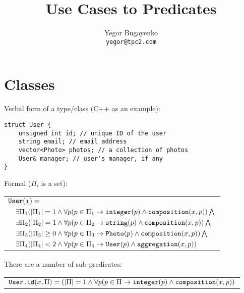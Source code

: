 \documentclass{article}
\begin{document}
\setlength{\parindent}{0pt}
\setlength{\parskip}{1em}
\newcommand{\type}[1]{\mbox{\texttt{#1}}}
\newenvironment{maths}
{
    \vspace*{1em}
    \begin{tabular}{l}
}
{
    \end{tabular}
    \vspace*{1em}
}

\title{Use Cases to Predicates}
\author{Yegor Bugayenko\\\texttt{yegor@tpc2.com}}
\maketitle

\newpage
\section{Classes}

    Verbal form of a type/class (C++ as an example):

    \begin{verbatim}
struct User {
    unsigned int id; // unique ID of the user
    string email; // email address
    vector<Photo> photos; // a collection of photos
    User& manager; // user's manager, if any
}\end{verbatim}

    Formal ($\Pi_i$ is a set):
    
    \begin{maths}
    $\type{User}(x) =$ \\
    $\quad \exists \Pi_1 (|\Pi_1| = 1 \wedge \forall p(p \in \Pi_1 \to \type{integer}(p) \wedge \type{composition}(x, p)) \bigwedge$ \\
    $\quad \exists \Pi_2 (|\Pi_2| = 1 \wedge \forall p(p \in \Pi_2 \to \type{string}(p) \wedge \type{composition}(x, p)) \bigwedge$ \\
    $\quad \exists \Pi_3 (|\Pi_3| \geq 0 \wedge \forall p(p \in \Pi_3 \to \type{Photo}(p) \wedge \type{composition}(x, p)) \bigwedge$ \\
    $\quad \exists \Pi_4 (|\Pi_4| < 2 \wedge \forall p(p \in \Pi_4 \to \type{User}(p) \wedge \type{aggregation}(x, p))$ \\
    \end{maths}
    
    There are a number of sub-predicates:

    \begin{maths}
    $\type{User.id}(x, \Pi) = (|\Pi| = 1 \wedge \forall p(p \in \Pi \to \type{integer}(p) \wedge \type{composition}(x, p))$ \\
    \end{maths}
    
\end{document}
